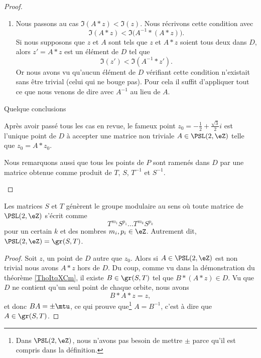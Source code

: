 \begin{proof}
\begin{subproof}
\begin{enumerate}
                    \item
                        Nous passons au cas \( \Im(A*z)<\Im(z)\). Nous récrivons cette condition avec
                        \begin{equation}
                            \Im(A*z)<\Im\big( A^{-1}*(A*z) \big).
                        \end{equation}
                        Si nous supposons que \( z\) et \( A\) sont tels que \( z\) et \( A*z\) soient tous deux dans \( D\), alors \( z'=A*z\) est un élément de \( D\) tel que
                        \begin{equation}
                            \Im(z')<\Im(A^{-1}*z').
                        \end{equation}
                        Or nous avons vu qu'aucun élément de \( D\) vérifiant cette condition n'existait sans être trivial (celui qui ne bouge pas). Pour cela il suffit d'appliquer tout ce que nous venons de dire avec \( A^{-1}\) au lieu de \( A\).
                \end{enumerate}

            \item[Quelque conclusions]

                Après avoir passé tous les cas en revue, le fameux point \( z_0=-\frac{ 1 }{2}+\frac{ \sqrt{3} }{2}i\) est l'unique point de \( D\) à accepter une matrice non triviale \( A\in \PSL(2,\eZ)\) telle que \( z_0=A*z_0\).

                Nous remarquons aussi que tous les points de \( P\) sont ramenés dans \( D\) par une matrice obtenue comme produit de \( T\), \( S\), \( T^{-1}\) et \( S^{-1}\).

    \end{subproof}
\end{proof}

\begin{corollary}    \label{CorJQwgNp}
    Les matrices \( S\) et \( T\) génèrent le groupe modulaire au sens où toute matrice de \( \PSL(2,\eZ)\) s'écrit comme
    \begin{equation}
        T^{m_1}S^{p_1}\ldots T^{m_k}S^{p_k}
    \end{equation}
    pour un certain \( k\) et des nombres \( m_i,p_i\in \eZ\). Autrement dit, \( \PSL(2,\eZ)=\gr(S,T)\).
\end{corollary}

\begin{proof}
    Soit \( z\), un point de \( D\) autre que \( z_0\). Alors si \( A\in \PSL(2,\eZ)\) est non trivial nous avons \( A*z\) hors de \( D\). Du coup, comme vu dans la démonstration du théorème \ref{ThoItqXCm}, il existe \( B\in \gr(S,T)\) tel que \( B*(A*z)\in D\). Vu que \( D\) ne contient qu'un seul point de chaque orbite, nous avons
    \begin{equation}
        B*A*z=z,
    \end{equation}
    et donc \( BA=\pm\mtu\), ce qui prouve que\footnote{Dans \( \PSL(2,\eZ)\), nous n'avons pas besoin de mettre \( \pm\) parce qu'il est compris dans la définition.} \( A=B^{-1}\), c'est à dire que \( A\in\gr(S,T)\).
\end{proof}

